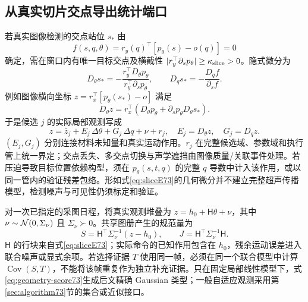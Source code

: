 \documentclass[UTF8,fontset=fandol,zihao=5,a4paper]{ctexart}
\DeclareMathOperator{\Cov}{Cov}\DeclareMathOperator{\im}{im}
\theoremstyle{definition}
\theoremstyle{remark}\newtheorem{remark}[theorem]{说明}
\numberwithin{equation}{section}
\begin{document}
\subsection{从真实切片交点导出统计端口}
若真实图像检测的交点站位 $s_*$ 由
\begin{equation}
f(s,q,\theta)=r_y(q)^\top[p_\theta(s)-o(q)]=0
\end{equation}
确定，需在窗口内有唯一目标交点及横截性
$|r_y^\top\partial_s p_\theta|\ge\kappa_{\rm slice}>0$。隐式微分为
\begin{equation}
D_\theta s_*=-\frac{r_y^\top D_\theta p_\theta}
{r_y^\top\partial_s p_\theta},\qquad
D_qs_*=-\frac{D_qf}{\partial_sf}.
\label{eq:sliceimplicit73}
\end{equation}
例如图像横向坐标 $z=r_x^\top[p_\theta(s_*)-o]$ 满足
\begin{equation}
D_\theta z=r_x^\top\left(D_\theta p_\theta+
\partial_sp_\theta D_\theta s_*\right).
\label{eq:sliceE73}
\end{equation}
于是候选 $j$ 的实际局部观测写成
\begin{equation}
z=\bar z_j+E_j\,\Delta\theta+G_j\,\Delta q+\nu+r_j,
\quad E_j=D_\theta z,\quad G_j=D_qz.
\label{eq:localobservation73}
\end{equation}
$(E_j,G_j)$ 分别连接材料未知量和真实运动作用。$r_j$ 在完整候选域、参数域和执行管上统一界定；交点丢失、多交点切换与声学遮挡由图像质量/关联事件处理。若压迫导致目标位置依赖构型，须在 $p_\theta(s,t,q)$ 的完整 $q$ 导数中计入该作用，或以同一管内的验证残差包络。形如式\eqref{eq:sliceE73}的几何微分并不建立完整超声传播模型，检测噪声与可见性仍须标定和验证。

对一次已指定的采图日程，将真实观测堆叠为 $z=h_0+\mathsf H\theta+\nu$，其中 $\nu\sim\mathcal N(0,\Sigma_\nu)$ 且 $\Sigma_\nu\succ0$。共享图册产生的规范量为
\begin{equation}
S=\mathsf H^\top\Sigma_\nu^{-1}(z-h_0),\qquad
J=\mathsf H^\top\Sigma_\nu^{-1}\mathsf H.
\label{eq:geometry-score73}
\end{equation}
\(\mathsf H\) 的行块来自式\eqref{eq:sliceE73}；实际命令的已知作用包含在 $h_0$，残余运动误差进入联合噪声或显式余项。若选择证据 $T$ 使用同一帧，必须在同一个联合模型中计算 $\Cov(S,T)$，不能将该帧重复作为独立补充证据。只在固定局部线性模型下，式\eqref{eq:geometry-score73}生成后文精确 Gaussian 类型；一般自适应观测采用第\ref{sec:algorithm73}节的集合或近似接口。
\end{document}
